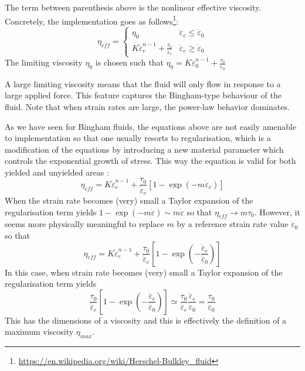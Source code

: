 The term between parenthesis above is the nonlinear effective viscosity. Concretely, the implementation goes as 
follows\footnote{\url{https://en.wikipedia.org/wiki/Herschel-Bulkley_fluid}}:
\[
\eta_{eff} = 
\left\{
\begin{array}{cc}
\eta_0 & \dot{\varepsilon}_e\leq \dot{\varepsilon}_0 \\ 
K \dot{\varepsilon}_e^{n-1} + \frac{\tau_0}{\dot{\varepsilon}_e} & \dot{\varepsilon}_e \geq \dot{\varepsilon}_0
\end{array}
\right.
\]
The limiting viscosity $\eta_0$ is chosen such that 
$\eta_0 =  K \dot{\varepsilon}_0^{n-1} + \frac{\tau_0}{\dot{\varepsilon}_0}$

A large limiting viscosity means that the fluid will only flow in response to a large applied force. 
This feature captures the Bingham-type behaviour of the fluid. 
Note that when strain rates are large, the power-law behavior dominates. 

As we have seen for Bingham fluids, the equations above are not easily amenable to implementation so that 
one usually resorts to regularisation, which is a modification of the 
equations by introducing a new material parameter which controls the exponential 
growth of stress. This way the equation is valid for both yielded and unyielded areas
\cite{blmi97,papa87,zifr07,svna18}:
\begin{equation}
\eta_{eff} = K \dot{\varepsilon}_e^{n-1} + \frac{\tau_0}{\dot{\varepsilon}_e} [1 - \exp(-m \dot{\varepsilon}_e)] 
\end{equation}
When the strain rate becomes (very) small a Taylor expansion of the regularisation 
term yields $1- \exp(-m \dot{\varepsilon}) \sim m \dot{\varepsilon} $ so that 
$\eta_{eff} \rightarrow m \tau_0$.
However, it seems more physically meaningful to replace $m$ by a reference strain rate value $\dot{\varepsilon}_0$ so that 
\begin{equation}
\eta_{eff} = K \dot{\varepsilon}_e^{n-1} + \frac{\tau_0}{\dot{\varepsilon}_e} \left[1 - \exp\left(-\frac{\dot{\varepsilon}_e}{\dot{\varepsilon}_0} \right) \right] 
\end{equation}
In this case, when strain rate becomes (very) small a Taylor expansion of the regularisation
term yields
\begin{equation}
\frac{\tau_0}{\dot{\varepsilon}_e} \left[1 - \exp\left(-\frac{\dot{\varepsilon}_e}{\dot{\varepsilon}_0} \right) \right]
\simeq 
\frac{\tau_0}{\dot{\varepsilon}_e} \frac{\dot{\varepsilon}_e}{\dot{\varepsilon}_0}
=
\frac{\tau_0}{\dot{\varepsilon}_0} 
\end{equation}
This has the dimensions of a viscosity and this is effectively the definition of a maximum viscosity $\eta_{max}$.



